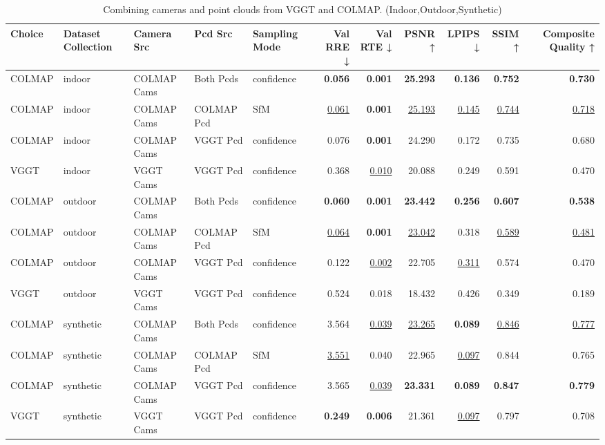 \begin{table}[H]
\caption{\ifdefined\customcaption \customcaption \else Combining cameras and point clouds from VGGT and COLMAP. (Indoor,Outdoor,Synthetic) \fi}
\label{tab:07_combined_single_brief_indoor,outdoor,synthetic}
\centering
\tiny
\begin{tabular}{lllllrrrrrr}
\toprule
Choice & Dataset Collection & Camera Src & Pcd Src & Sampling Mode & Val RRE ↓ & Val RTE ↓ & PSNR ↑ & LPIPS ↓ & SSIM ↑ & Composite Quality ↑ \\
\midrule
COLMAP & indoor & COLMAP Cams & Both Pcds & confidence & \textbf{0.056} & \textbf{0.001} & \textbf{25.293} & \textbf{0.136} & \textbf{0.752} & \textbf{0.730} \\
COLMAP & indoor & COLMAP Cams & COLMAP Pcd & SfM & \underline{0.061} & \textbf{0.001} & \underline{25.193} & \underline{0.145} & \underline{0.744} & \underline{0.718} \\
COLMAP & indoor & COLMAP Cams & VGGT Pcd & confidence & 0.076 & \textbf{0.001} & 24.290 & 0.172 & 0.735 & 0.680 \\
VGGT & indoor & VGGT Cams & VGGT Pcd & confidence & 0.368 & \underline{0.010} & 20.088 & 0.249 & 0.591 & 0.470 \\
\midrule
COLMAP & outdoor & COLMAP Cams & Both Pcds & confidence & \textbf{0.060} & \textbf{0.001} & \textbf{23.442} & \textbf{0.256} & \textbf{0.607} & \textbf{0.538} \\
COLMAP & outdoor & COLMAP Cams & COLMAP Pcd & SfM & \underline{0.064} & \textbf{0.001} & \underline{23.042} & 0.318 & \underline{0.589} & \underline{0.481} \\
COLMAP & outdoor & COLMAP Cams & VGGT Pcd & confidence & 0.122 & \underline{0.002} & 22.705 & \underline{0.311} & 0.574 & 0.470 \\
VGGT & outdoor & VGGT Cams & VGGT Pcd & confidence & 0.524 & 0.018 & 18.432 & 0.426 & 0.349 & 0.189 \\
\midrule
COLMAP & synthetic & COLMAP Cams & Both Pcds & confidence & 3.564 & \underline{0.039} & \underline{23.265} & \textbf{0.089} & \underline{0.846} & \underline{0.777} \\
COLMAP & synthetic & COLMAP Cams & COLMAP Pcd & SfM & \underline{3.551} & 0.040 & 22.965 & \underline{0.097} & 0.844 & 0.765 \\
COLMAP & synthetic & COLMAP Cams & VGGT Pcd & confidence & 3.565 & \underline{0.039} & \textbf{23.331} & \textbf{0.089} & \textbf{0.847} & \textbf{0.779} \\
VGGT & synthetic & VGGT Cams & VGGT Pcd & confidence & \textbf{0.249} & \textbf{0.006} & 21.361 & \underline{0.097} & 0.797 & 0.708 \\
\bottomrule
\end{tabular}
\end{table}